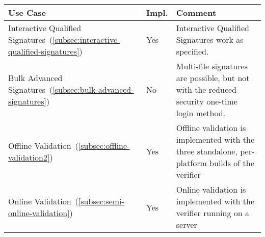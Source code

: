 \begin{center}
    \begin{longtable}{p{5.35cm}|p{0.7cm}|p{9.0cm}}
        \textbf{Use Case} & \textbf{Impl.} & \textbf{Comment}
        \\
        \hline
        Interactive Qualified Signatures~(\ref{subsec:interactive-qualified-signatures})
        & Yes
        & Interactive Qualified Signatures work as specified.
        \\
        \hline
        Bulk Advanced Signatures~(\ref{subsec:bulk-advanced-signatures})
        & No
        & Multi-file signatures are possible,
        but not with the reduced-security one-time login method.
        \\
        \hline
        Offline Validation~(\ref{subsec:offline-validation2})
        & Yes
        & Offline validation is implemented with the three standalone,
        per-platform builds of the verifier
        \\
        \hline
        Online Validation~(\ref{subsec:semi-online-validation})
        & Yes
        & Online validation is implemented with the verifier running on a server
        \\
        \hline
    \end{longtable}
\end{center}
